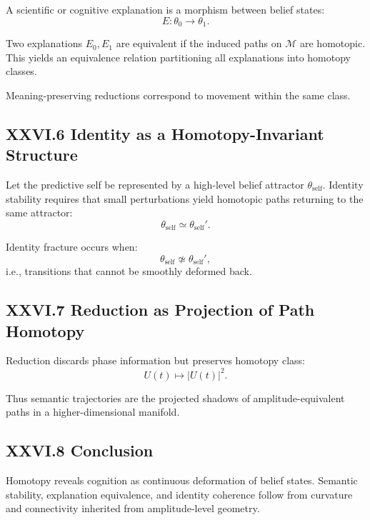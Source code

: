 \documentclass[12pt,letterpaper]{article}
\begin{document}
A scientific or cognitive explanation is a morphism between belief states:
\[
E : \theta_0 \to \theta_1.
\]

Two explanations $E_0, E_1$ are equivalent if the induced paths on $\mathcal{M}$ are homotopic. This yields an equivalence relation partitioning all explanations into homotopy classes.

Meaning-preserving reductions correspond to movement within the same class.

\subsection{XXVI.6 Identity as a Homotopy-Invariant Structure}

Let the predictive self be represented by a high-level belief attractor $\theta_{\text{self}}$. Identity stability requires that small perturbations yield homotopic paths returning to the same attractor:
\[
\theta_{\text{self}} \simeq \theta_{\text{self}}'.
\]

Identity fracture occurs when:
\[
\theta_{\text{self}} \not\simeq \theta_{\text{self}}',
\]
i.e., transitions that cannot be smoothly deformed back.

\subsection{XXVI.7 Reduction as Projection of Path Homotopy}

Reduction discards phase information but preserves homotopy class:
\[
U(t) \mapsto |U(t)|^2.
\]

Thus semantic trajectories are the projected shadows of amplitude-equivalent paths in a higher-dimensional manifold.

\subsection{XXVI.8 Conclusion}

Homotopy reveals cognition as continuous deformation of belief states. Semantic stability, explanation equivalence, and identity coherence follow from curvature and connectivity inherited from amplitude-level geometry.
\end{document}
